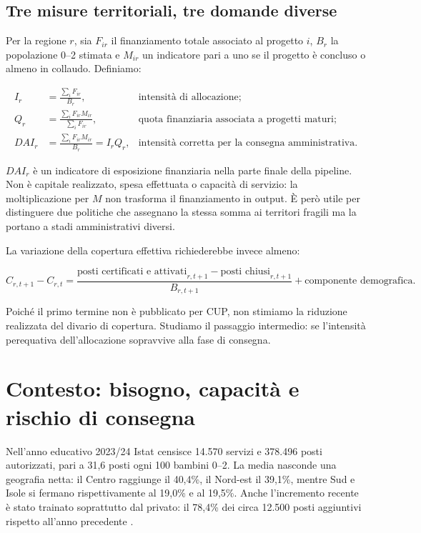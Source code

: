 \documentclass[10pt,a4paper]{article}
\begin{document}
\subsection{Tre misure territoriali, tre domande diverse}

Per la regione $r$, sia $F_{ir}$ il finanziamento totale associato al progetto $i$, $B_r$ la popolazione 0--2 stimata e $M_{ir}$ un indicatore pari a uno se il progetto è concluso o almeno in collaudo. Definiamo:

\begin{align}
  I_r &= \frac{\sum_i F_{ir}}{B_r},
  &\text{intensità di allocazione;}\\
  Q_r &= \frac{\sum_i F_{ir}M_{ir}}{\sum_i F_{ir}},
  &\text{quota finanziaria associata a progetti maturi;}\\
  DAI_r &= \frac{\sum_i F_{ir}M_{ir}}{B_r}=I_rQ_r,
  &\text{intensità corretta per la consegna amministrativa.}
\end{align}

$DAI_r$ è un indicatore di esposizione finanziaria nella parte finale della pipeline. Non è capitale realizzato, spesa effettuata o capacità di servizio: la moltiplicazione per $M$ non trasforma il finanziamento in output. È però utile per distinguere due politiche che assegnano la stessa somma ai territori fragili ma la portano a stadi amministrativi diversi.

La variazione della copertura effettiva richiederebbe invece almeno:

\begin{equation}
  C_{r,t+1}-C_{r,t}
  = \frac{\text{posti certificati e attivati}_{r,t+1}
  -\text{posti chiusi}_{r,t+1}}{B_{r,t+1}}
  +\text{componente demografica}.
\end{equation}

Poiché il primo termine non è pubblicato per CUP, non stimiamo la riduzione realizzata del divario di copertura. Studiamo il passaggio intermedio: se l'intensità perequativa dell'allocazione sopravvive alla fase di consegna.

\section{Contesto: bisogno, capacità e rischio di consegna}

Nell'anno educativo 2023/24 Istat censisce 14.570 servizi e 378.496 posti autorizzati, pari a 31,6 posti ogni 100 bambini 0--2. La media nasconde una geografia netta: il Centro raggiunge il 40,4\%, il Nord-est il 39,1\%, mentre Sud e Isole si fermano rispettivamente al 19,0\% e al 19,5\%. Anche l'incremento recente è stato trainato soprattutto dal privato: il 78,4\% dei circa 12.500 posti aggiuntivi rispetto all'anno precedente \citep{istat2026}.
\end{document}
